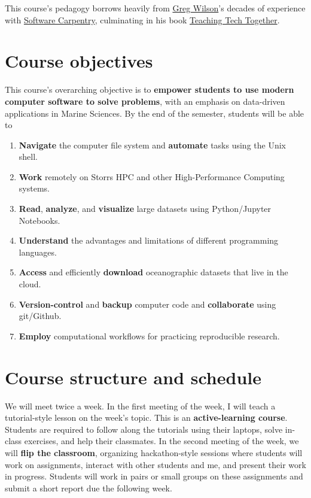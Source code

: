 \documentclass[11pt]{article}
\begin{document}
This course's pedagogy borrows heavily from \href{https://third-bit.com}{Greg Wilson}'s decades of experience with \href{https://software-carpentry.org}{Software Carpentry}, culminating in his book \href{https://teachtogether.tech/en/index.html}{Teaching Tech Together}.


\section*{Course objectives}
This course's overarching objective is to  \textbf{empower students to use modern computer software to solve problems}, with an emphasis on data-driven applications in Marine Sciences. By the end of the semester, students will be able to 

\begin{enumerate}
	\item \textbf{Navigate} the computer file system and \textbf{automate} tasks using the Unix shell.
	\item \textbf{Work} remotely on Storrs HPC and other High-Performance Computing systems.
	\item \textbf{Read}, \textbf{analyze}, and \textbf{visualize} large datasets using Python/Jupyter Notebooks.
	\item \textbf{Understand} the advantages and limitations of different programming languages.
	\item \textbf{Access} and efficiently \textbf{download}  oceanographic datasets that live in the cloud. 
	\item \textbf{Version-control} and \textbf{backup} computer code and \textbf{collaborate} using git/Github.
	\item \textbf{Employ} computational workflows for practicing reproducible research.
\end{enumerate}

\section*{Course structure and schedule}

We will meet twice a week. In the first meeting of the week, I will teach a tutorial-style lesson on the week's topic. This is an \textbf{active-learning course}. Students are required to follow along the tutorials using their laptops, solve in-class exercises, and help their classmates. In the second meeting of the week, we will \textbf{flip the classroom}, organizing hackathon-style sessions where students will work on assignments, interact with other students and me, and present their work in progress.   Students will work in pairs or small groups on these assignments and submit a short report due the following week. 
\end{document}
